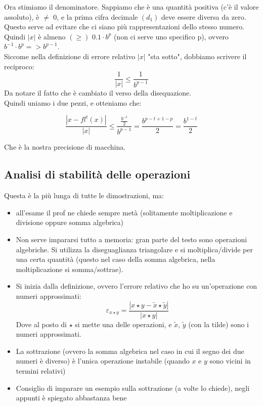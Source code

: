 Ora stimiamo il denominatore. Sappiamo che è una quantità positiva (c'è il valore assoluto), è $\neq$ 0, e la prima cifra decimale $(d_1)$ deve essere diversa da zero. Questo serve ad evitare che ci siano più rappresentazioni dello stesso numero.\\
Quindi $|x|$ è almeno $(\geq)$ $0.1 \cdot b^p$ (non ci serve uno specifico p), ovvero $b^{-1}\cdot b^p => b^{p-1}$.\\
Siccome nella definizione di errore relativo $|x|$ "sta sotto", dobbiamo scrivere il reciproco: 
\begin{displaymath}\frac{1}{|x|}\leq \frac{1}{b^{p-1}}\end{displaymath}
Da notare il fatto che è cambiato il verso della disequazione.\\
Quindi uniamo i due pezzi, e otteniamo che:\\
\begin{center}
    \large\begin{displaymath}
        \frac{|x-fl^t(x)|}{|x|}\leq \frac{\frac{b^{-t}}{2}}{b^{p-1}}= \frac{b^{p-t+1-p}}{2}= \frac{b^{1-t}}{2}
    \end{displaymath}
\end{center}
Che è la nostra precisione di macchina.
\newpage

\subsection{Analisi di stabilità delle operazioni}
Questa è la più lunga di tutte le dimostrazioni, ma:
\begin{itemize}
    \item all'esame il prof ne chiede sempre metà (solitamente moltiplicazione e divisione oppure somma algebrica)
    \item Non serve impararsi tutto a memoria: gran parte del testo sono operazioni algebriche. Si utilizza la diseguaglianza triangolare e si moltiplica/divide per una certa quantità (questo nel caso della somma algebrica, nella moltiplicazione si somma/sottrae).
    \item Si inizia dalla definizione, ovvero l'errore relativo che ho su un'operazione con numeri approssimati:\begin{displaymath}\varepsilon _{x\star y}=\frac{|x\star y - \widetilde{x}\star \widetilde{y}|}{|x \star y|} \end{displaymath}  Dove al posto di $\star$ si mette una delle operazioni, e $\widetilde{x}$, $\widetilde{y}$ (con la tilde) sono i numeri approssimati.
    \item La sottrazione (ovvero la somma algebrica nel caso in cui il segno dei due numeri è diverso) è l'unica operazione instabile (quando $x$ e $y$ sono vicini in termini relativi)
    \item Consiglio di imparare un esempio sulla sottrazione (a volte lo chiede), negli appunti è spiegato abbastanza bene
\end{itemize}

